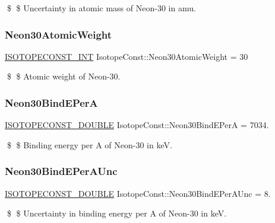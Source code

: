 \$ \$ Uncertainty in atomic mass of Neon-\/30 in amu. \mbox{\label{group___isotope_const-_neon-_ne30_ga9a5c4598a3417448d1c52008aba43c01}} 
\subsubsection{\texorpdfstring{Neon30\+Atomic\+Weight}{Neon30AtomicWeight}}
{\footnotesize\ttfamily \mbox{\hyperlink{group___isotope_const-_macros_ga5f18360b3e99483a35c32d789e62621c}{I\+S\+O\+T\+O\+P\+E\+C\+O\+N\+S\+T\+\_\+\+I\+NT}} Isotope\+Const\+::\+Neon30\+Atomic\+Weight = 30}

\$ \$ Atomic weight of Neon-\/30. \mbox{\label{group___isotope_const-_neon-_ne30_ga6d48c333b8a0d3e34b5a10d2faed2f64}} 
\subsubsection{\texorpdfstring{Neon30\+Bind\+E\+PerA}{Neon30BindEPerA}}
{\footnotesize\ttfamily \mbox{\hyperlink{group___isotope_const-_macros_ga8f45a7272ce02c0b4c65c44636ed719a}{I\+S\+O\+T\+O\+P\+E\+C\+O\+N\+S\+T\+\_\+\+D\+O\+U\+B\+LE}} Isotope\+Const\+::\+Neon30\+Bind\+E\+PerA = 7034.}

\$ \$ Binding energy per A of Neon-\/30 in keV. \mbox{\label{group___isotope_const-_neon-_ne30_gaa15f4bb3956c29a4e83572114e04a529}} 
\subsubsection{\texorpdfstring{Neon30\+Bind\+E\+Per\+A\+Unc}{Neon30BindEPerAUnc}}
{\footnotesize\ttfamily \mbox{\hyperlink{group___isotope_const-_macros_ga8f45a7272ce02c0b4c65c44636ed719a}{I\+S\+O\+T\+O\+P\+E\+C\+O\+N\+S\+T\+\_\+\+D\+O\+U\+B\+LE}} Isotope\+Const\+::\+Neon30\+Bind\+E\+Per\+A\+Unc = 8.}

\$ \$ Uncertainty in binding energy per A of Neon-\/30 in keV. \mbox{\label{group___isotope_const-_neon-_ne30_ga4de7272a5efca90b12daa9debf4dbdec}} 
